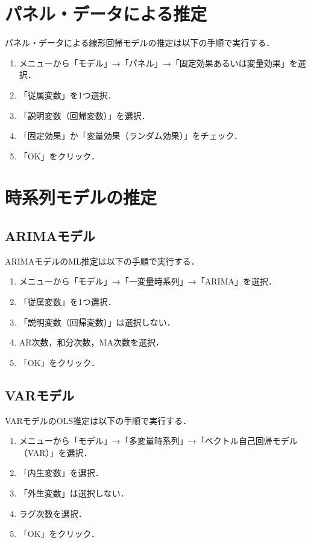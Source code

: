 \documentclass[
]{jlreq}
\providecommand{\tightlist}{%
  \setlength{\itemsep}{0pt}\setlength{\parskip}{0pt}}
\begin{document}
\section{パネル・データによる推定}\label{ux30d1ux30cdux30ebux30c7ux30fcux30bfux306bux3088ux308bux63a8ux5b9a}

パネル・データによる線形回帰モデルの推定は以下の手順で実行する．

\begin{enumerate}
\def\labelenumi{\arabic{enumi}.}
\tightlist
\item
  メニューから「モデル」→「パネル」→「固定効果あるいは変量効果」を選択．
\item
  「従属変数」を1つ選択．
\item
  「説明変数（回帰変数）」を選択．
\item
  「固定効果」か「変量効果（ランダム効果）」をチェック．
\item
  「OK」をクリック．
\end{enumerate}

\section{時系列モデルの推定}\label{ux6642ux7cfbux5217ux30e2ux30c7ux30ebux306eux63a8ux5b9a}

\subsection{ARIMAモデル}\label{arimaux30e2ux30c7ux30eb}

ARIMAモデルのML推定は以下の手順で実行する．

\begin{enumerate}
\def\labelenumi{\arabic{enumi}.}
\tightlist
\item
  メニューから「モデル」→「一変量時系列」→「ARIMA」を選択．
\item
  「従属変数」を1つ選択．
\item
  「説明変数（回帰変数）」は選択しない．
\item
  AR次数，和分次数，MA次数を選択．
\item
  「OK」をクリック．
\end{enumerate}

\subsection{VARモデル}\label{varux30e2ux30c7ux30eb}

VARモデルのOLS推定は以下の手順で実行する．

\begin{enumerate}
\def\labelenumi{\arabic{enumi}.}
\tightlist
\item
  メニューから「モデル」→「多変量時系列」→「ベクトル自己回帰モデル（VAR）」を選択．
\item
  「内生変数」を選択．
\item
  「外生変数」は選択しない．
\item
  ラグ次数を選択．
\item
  「OK」をクリック．
\end{enumerate}
\end{document}
